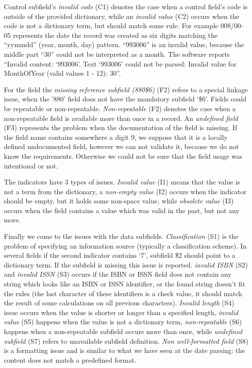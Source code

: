 Control subfield's \emph{invalid code} (C1) denotes the case when a control field's code is outside of the provided dictionary, while an \emph{invalid value} (C2) occurs when the code is not a dictionary term, but should match some rule. For example 008/00-05 represents the date the record was created as six digits matching the ``yymmdd'' (year, month, day) pattern. ``993006'' is an invalid value, because the middle part ``30'' could not be interpreted as a month. The software reports ``Invalid content: `993006'. Text `993006' could not be parsed: Invalid value for MonthOfYear (valid values 1 - 12): 30''.

For the field the \emph{missing reference subfield (880\$6)} (F2) refers to a special linkage issue, when the '880' field does not have the mandatory subfield `\$6'. Fields could be repeatable or non-repeatable. \emph{Non-repeatable} (F2) denotes the case when a non-repeatable field is available more than once in a record. An \emph{undefined field} (F3) represents the problem when the documentation of the field is missing. If the field name contains somewhere a digit 9, we suppose that it is a locally defined undocumented field, however we can not validate it, because we do not know the requirements. Otherwise we could not be sure that the field usage was intentional or not.

The indicators have 3 types of issues. \emph{Invalid value} (I1) means that the value is not a term from the dictionary, a \emph{non-empty value} (I2) occurs when the indicator should be empty, but it holds some non-space value, while \emph{obsolete value} (I3) occurs when the field contains a value which was valid in the past, but not any more.

Finally we come to the issues with the data subfields. \emph{Classification} (S1) is the problem of specifying an information source (typically a classification scheme). In several fields if the second indicator contains `7', subfield \$2 should point to a dictionary term. If the subfield is missing this issue is reported. \emph{invalid ISBN} (S2) and \emph{invalid ISSN} (S3) occurs if the ISBN or ISSN field does not contain any string which looks like an ISBN or ISSN identifier, or the found string doesn't fit the rules (the last character of these identifiers is a check value, it should match the result of some calculations on all previous characters). \emph{Invalid length} (S4) issue occurs when the value is shorter or longer than a specified length, \emph{invalid value} (S5) happens when the value is not a dictionary term, \emph{non-repeatable} (S6) happens when a non-repeatable subfield occurs more than once, while \emph{undefined subfield} (S7) refers to unavailable subfield definition. \emph{Non well-formatted field} (S8) is a formatting issue and is similar to what we have seen at the date parsing: the content does not match a predefined format. 

